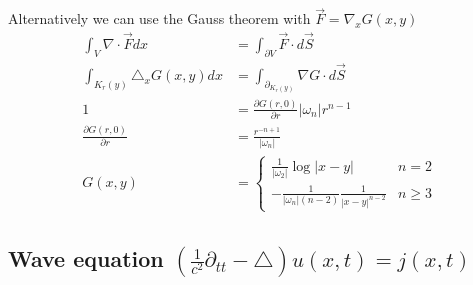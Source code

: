 \documentclass[../main.tex]{subfiles}
\begin{document}
Alternatively we can use the Gauss theorem with $\vec{F}=\nabla_x G(x,y)$
\begin{align}
    \int_V \nabla\cdot \vec{F} dx&=\int_{\partial V} \vec{F}\cdot d\vec{S}\\
    \int_{K_r(y)} \triangle_x G(x,y) dx&=\int_{\partial _{K_r(y)}} \nabla G\cdot d\vec{S}\\
    1&=\frac{\partial G(r,0)}{\partial r}|\omega_{n}|r^{n-1}\\
    \frac{\partial G(r,0)}{\partial r} &= \frac{r^{-n+1}}{|\omega_n|}\\
    G(x,y)&=\left\{\begin{array}{cc}
         \frac{1}{|\omega_2|}\log{|x-y|}                    & n=2  \\
         -\frac{1}{|\omega_n|(n-2)}\frac{1}{|x-y|^{n-2}}    & n\ge3 
    \end{array}\right.
\end{align}

\newpage
\subsection{Wave equation \texorpdfstring{$\left(\frac{1}{c^2}\partial_{tt}-\triangle\right) u(x,t)= j(x,t)$}{TEXT}}
\end{document}
